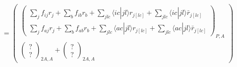 \begin{align}
&= \begin{pmatrix}
 \begin{pmatrix}
\sum_j f_{ij}r_j+ \sum_b f_{ib}r_b + \sum_{jlc} \langle i c | jl \rangle r_{j[lc]} + \sum_{jlc} \langle i c | jl \rangle \bar{r}_{j[lc]} \\ \sum_j f_{aj}r_j+ \sum_b f_{ab}r_b + \sum_{jlc} \langle a c | jl \rangle r_{j[lc]} + \sum_{jlc} \langle a c | jl \rangle \bar{r}_{j[lc]}
\end{pmatrix}_{P,A} \\[6pt]
\begin{pmatrix}
    ?\\
 ?
\end{pmatrix}_{2A,A} +
 \begin{pmatrix}
? \\
?
\end{pmatrix}_{2A,A}
\end{pmatrix} \\
\end{align}
